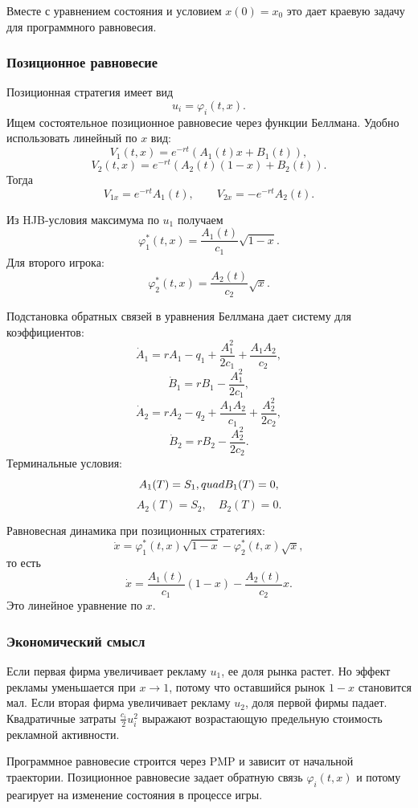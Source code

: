 \documentclass[12pt,a4paper]{article}
\begin{document}
Вместе с уравнением состояния и условием $x(0)=x_0$ это дает краевую задачу для программного равновесия.

\subsubsection{Позиционное равновесие}

Позиционная стратегия имеет вид
\[
 u_i=\varphi_i(t,x).
\]
Ищем состоятельное позиционное равновесие через функции Беллмана. Удобно использовать линейный по $x$ вид:
\[
 V_1(t,x)=e^{-rt}(A_1(t)x+B_1(t)),
\]
\[
 V_2(t,x)=e^{-rt}(A_2(t)(1-x)+B_2(t)).
\]
Тогда
\[
 V_{1x}=e^{-rt}A_1(t),\qquad V_{2x}=-e^{-rt}A_2(t).
\]

Из HJB-условия максимума по $u_1$ получаем
\[
 \varphi_1^*(t,x)=\frac{A_1(t)}{c_1}\sqrt{1-x}.
\]
Для второго игрока:
\[
 \varphi_2^*(t,x)=\frac{A_2(t)}{c_2}\sqrt{x}.
\]

Подстановка обратных связей в уравнения Беллмана дает систему для коэффициентов:
\[
 \dot A_1=rA_1-q_1+\frac{A_1^2}{2c_1}+\frac{A_1A_2}{c_2},
\]
\[
 \dot B_1=rB_1-\frac{A_1^2}{2c_1},
\]
\[
 \dot A_2=rA_2-q_2+\frac{A_1A_2}{c_1}+\frac{A_2^2}{2c_2},
\]
\[
 \dot B_2=rB_2-\frac{A_2^2}{2c_2}.
\]
Терминальные условия:
\[
 A_1(T)=S_1,\\quad B_1(T)=0,
\]
\[
 A_2(T)=S_2,
\quad B_2(T)=0.
\]

Равновесная динамика при позиционных стратегиях:
\[
 \dot x=\varphi_1^*(t,x)\sqrt{1-x}-\varphi_2^*(t,x)\sqrt{x},
\]
то есть
\[
 \dot x=\frac{A_1(t)}{c_1}(1-x)-\frac{A_2(t)}{c_2}x.
\]
Это линейное уравнение по $x$.

\subsubsection{Экономический смысл}

Если первая фирма увеличивает рекламу $u_1$, ее доля рынка растет. Но эффект рекламы уменьшается при $x\to1$, потому что оставшийся рынок $1-x$ становится мал. Если вторая фирма увеличивает рекламу $u_2$, доля первой фирмы падает. Квадратичные затраты $\frac{c_i}{2}u_i^2$ выражают возрастающую предельную стоимость рекламной активности.

Программное равновесие строится через PMP и зависит от начальной траектории. Позиционное равновесие задает обратную связь $\varphi_i(t,x)$ и потому реагирует на изменение состояния в процессе игры.
\end{document}
